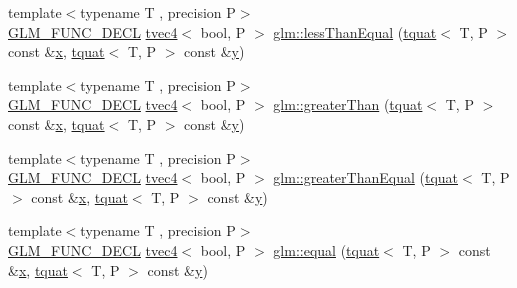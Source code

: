 \begin{DoxyCompactItemize}
\item 
{\footnotesize template$<$typename T , precision P$>$ }\\\mbox{\hyperlink{setup_8hpp_ab2d052de21a70539923e9bcbf6e83a51}{G\+L\+M\+\_\+\+F\+U\+N\+C\+\_\+\+D\+E\+CL}} \mbox{\hyperlink{structglm_1_1tvec4}{tvec4}}$<$ bool, P $>$ \mbox{\hyperlink{group__gtc__quaternion_ga7c81996ed2724f26fe76faf352c76294}{glm\+::less\+Than\+Equal}} (\mbox{\hyperlink{structglm_1_1tquat}{tquat}}$<$ T, P $>$ const \&\mbox{\hyperlink{glad_8h_a92d0386e5c19fb81ea88c9f99644ab1d}{x}}, \mbox{\hyperlink{structglm_1_1tquat}{tquat}}$<$ T, P $>$ const \&\mbox{\hyperlink{glad_8h_a66ddd433d2cacfe27f5906b7e86faeed}{y}})
\item 
{\footnotesize template$<$typename T , precision P$>$ }\\\mbox{\hyperlink{setup_8hpp_ab2d052de21a70539923e9bcbf6e83a51}{G\+L\+M\+\_\+\+F\+U\+N\+C\+\_\+\+D\+E\+CL}} \mbox{\hyperlink{structglm_1_1tvec4}{tvec4}}$<$ bool, P $>$ \mbox{\hyperlink{group__gtc__quaternion_ga09d21a588ae425ac7517ea65cc59a5ae}{glm\+::greater\+Than}} (\mbox{\hyperlink{structglm_1_1tquat}{tquat}}$<$ T, P $>$ const \&\mbox{\hyperlink{glad_8h_a92d0386e5c19fb81ea88c9f99644ab1d}{x}}, \mbox{\hyperlink{structglm_1_1tquat}{tquat}}$<$ T, P $>$ const \&\mbox{\hyperlink{glad_8h_a66ddd433d2cacfe27f5906b7e86faeed}{y}})
\item 
{\footnotesize template$<$typename T , precision P$>$ }\\\mbox{\hyperlink{setup_8hpp_ab2d052de21a70539923e9bcbf6e83a51}{G\+L\+M\+\_\+\+F\+U\+N\+C\+\_\+\+D\+E\+CL}} \mbox{\hyperlink{structglm_1_1tvec4}{tvec4}}$<$ bool, P $>$ \mbox{\hyperlink{group__gtc__quaternion_ga0906a221a2037519fcf316ea5c1e3b3e}{glm\+::greater\+Than\+Equal}} (\mbox{\hyperlink{structglm_1_1tquat}{tquat}}$<$ T, P $>$ const \&\mbox{\hyperlink{glad_8h_a92d0386e5c19fb81ea88c9f99644ab1d}{x}}, \mbox{\hyperlink{structglm_1_1tquat}{tquat}}$<$ T, P $>$ const \&\mbox{\hyperlink{glad_8h_a66ddd433d2cacfe27f5906b7e86faeed}{y}})
\item 
{\footnotesize template$<$typename T , precision P$>$ }\\\mbox{\hyperlink{setup_8hpp_ab2d052de21a70539923e9bcbf6e83a51}{G\+L\+M\+\_\+\+F\+U\+N\+C\+\_\+\+D\+E\+CL}} \mbox{\hyperlink{structglm_1_1tvec4}{tvec4}}$<$ bool, P $>$ \mbox{\hyperlink{group__gtc__quaternion_gac187115710365e0b2902220b9611e7b6}{glm\+::equal}} (\mbox{\hyperlink{structglm_1_1tquat}{tquat}}$<$ T, P $>$ const \&\mbox{\hyperlink{glad_8h_a92d0386e5c19fb81ea88c9f99644ab1d}{x}}, \mbox{\hyperlink{structglm_1_1tquat}{tquat}}$<$ T, P $>$ const \&\mbox{\hyperlink{glad_8h_a66ddd433d2cacfe27f5906b7e86faeed}{y}})

\end{DoxyCompactItemize}
